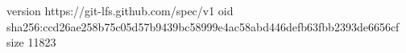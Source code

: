 version https://git-lfs.github.com/spec/v1
oid sha256:ccd26ae258b75c05d57b9439bc58999e4ac58abd446defb63fbb2393de6656cf
size 11823
